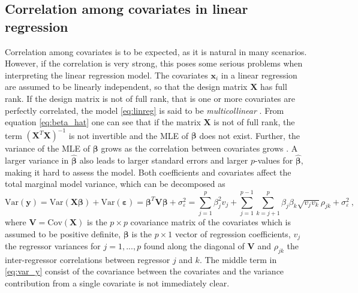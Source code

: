 \subsection{Correlation among covariates in linear regression}
Correlation among covariates is to be expected, as it is natural in many scenarios. However, if the correlation is very strong, this poses some serious problems when interpreting the linear regression model.
The covariates $\mathbf{x}_i$ in a linear regression are assumed to be linearly independent, so that the design matrix $\mathbf{X}$ has full rank.
If the design matrix is not of full rank, that is one or more covariates are perfectly correlated, the model \eqref{eq:linreg} is said to be \textit{multicollinear} \citep{Poole_OFarrell_1971}. 
From equation \eqref{eq:beta_hat} one can see that if the matrix $\mathbf{X}$ is not of full rank, the term $(\mathbf{X}^T\mathbf{X})^{-1}$ is not invertible and the MLE of $\boldsymbol{\beta}$ does not exist. 
Further, the variance of the MLE of $\boldsymbol{\beta}$ grows as the correlation between covariates grows \citep[p. 116]{GLMM_book}. A larger variance in $\boldsymbol{\hat{\beta}}$ also leads to larger standard errors and larger $p$-values for $\boldsymbol{\hat{\beta}}$, making it hard to assess the model.
Both coefficients and covariates affect the total marginal model variance, which can be decomposed as
\begin{equation}
    \label{eq:var_y}
    \text{Var}(\mathbf{y}) = \text{Var}(\mathbf{X}\boldsymbol{\beta}) + \text{Var}(\boldsymbol{\varepsilon}) = \boldsymbol{\beta}^T\mathbf{V}\boldsymbol{\beta} + \sigma^2_{\varepsilon} = \sum_{j=1}^p\beta_j^2v_j +\sum_{j=1}^{p-1}\sum_{k=j+1}^{p} \beta_j\beta_k\sqrt{v_jv_k}\rho_{jk} + \sigma_{\varepsilon}^2 \ ,
\end{equation}
\citep{gromping_relaimpo} where $\mathbf{V} = \text{Cov}(\mathbf{X})$ is the $p \times p$ covariance matrix of the covariates which is assumed to be positive definite, $\boldsymbol{\beta}$ is the $p \times 1$ vector of regression coefficients, $v_j$ the regressor variances for $j=1, ..., p$ found along the diagonal of $\mathbf{V}$ and $\rho_{jk}$ the inter-regressor correlations between regressor $j$ and $k$.
The middle term in \ref{eq:var_y} consist of the covariance between the covariates and the variance contribution from a single covariate is not immediately clear.


